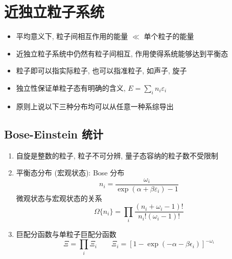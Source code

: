 \documentclass[12pt,a4paper]{article}%
\numberwithin{equation}{section}
\begin{document}
\section{近独立粒子系统} %
\label{sec:independent_partical_system}
\begin{itemize}
    \item 平均意义下, 粒子间相互作用的能量 $\ll$ 单个粒子的能量
    \item 近独立粒子系统中仍然有粒子间相互, 作用使得系统能够达到平衡态
    \item 粒子即可以指实际粒子, 也可以指准粒子, 如声子, 旋子
    \item 独立性保证单粒子态有明确的含义, $E = \sum_i n_i\varepsilon_i$
    \item 原则上说以下三种分布均可以从任意一种系综导出
\end{itemize}
\subsection[Bose 统计]{Bose-Einstein 统计} %
\label{sub:bose_stat}
\begin{enumerate}
    \item 自旋是整数的粒子, 粒子不可分辨, 量子态容纳的粒子数不受限制
    \item 平衡态分布 (宏观状态): Bose 分布
    \begin{equation}
        n_i = \frac{\omega_i}{\exp(\alpha + \beta\varepsilon_i) - 1}
    \end{equation}
    微观状态与宏观状态的关系
    \begin{equation}
        \Omega\{n_i\} = \prod_i\frac{(n_i+\omega_i-1)!}{n_i!(\omega_i-1)!}
    \end{equation}
    \item 巨配分函数与单粒子巨配分函数
    \begin{equation}
        \Xi = \prod_i\Xi_i \qquad 
        \Xi_i = \left[1-\exp(-\alpha-\beta\epsilon_i)\right]^{-\omega_i}
    \end{equation}
\end{enumerate}
\end{document}
